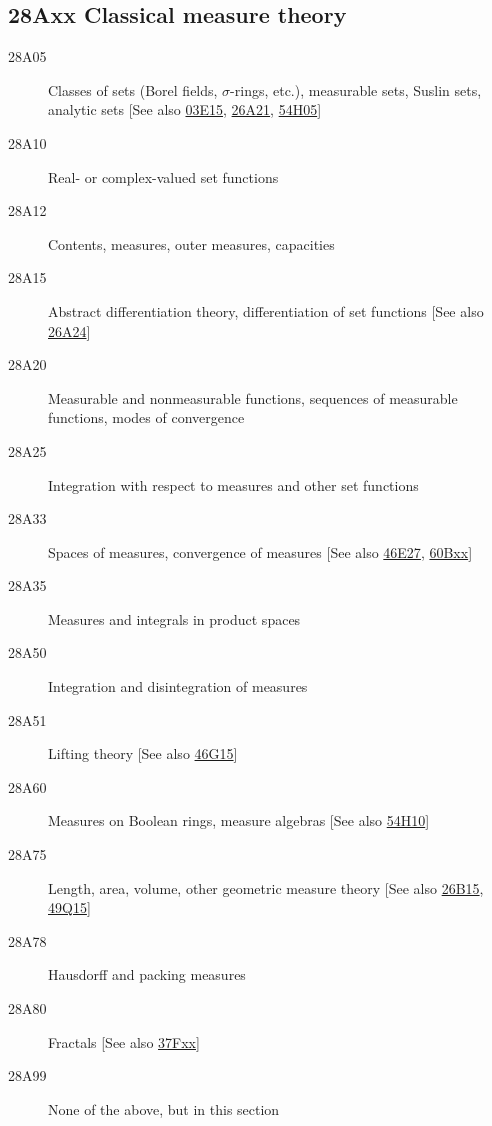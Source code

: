 \documentclass[letterpaper]{article}
\begin{document}
\subsection*{28Axx  Classical measure theory }\label{28Axx}
\begin{description}  
\item [28A05]\label{28A05} Classes of sets (Borel fields, $\sigma$-rings, etc.), measurable sets, Suslin sets, analytic sets [See also \hyperref[03E15]{03E15}, \hyperref[26A21]{26A21}, \hyperref[54H05]{54H05}]
\item [28A10]\label{28A10} Real- or complex-valued set functions
\item [28A12]\label{28A12} Contents, measures, outer measures, capacities
\item [28A15]\label{28A15} Abstract differentiation theory, differentiation of set functions [See also \hyperref[26A24]{26A24}]
\item [28A20]\label{28A20} Measurable and nonmeasurable functions, sequences of measurable functions, modes of convergence
\item [28A25]\label{28A25} Integration with respect to measures and other set functions
\item [28A33]\label{28A33} Spaces of measures, convergence of measures [See also \hyperref[46E27]{46E27}, \hyperref[60Bxx]{60Bxx}]
\item [28A35]\label{28A35} Measures and integrals in product spaces
\item [28A50]\label{28A50} Integration and disintegration of measures
\item [28A51]\label{28A51} Lifting theory [See also \hyperref[46G15]{46G15}]
\item [28A60]\label{28A60} Measures on Boolean rings, measure algebras [See also \hyperref[54H10]{54H10}]
\item [28A75]\label{28A75} Length, area, volume, other geometric measure theory [See also \hyperref[26B15]{26B15}, \hyperref[49Q15]{49Q15}]
\item [28A78]\label{28A78} Hausdorff and packing measures
\item [28A80]\label{28A80} Fractals [See also \hyperref[37Fxx]{37Fxx}]
\item [28A99]\label{28A99} None of the above, but in this section
\end{description}
\end{document}
